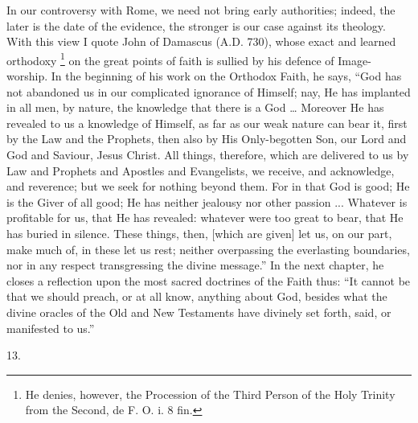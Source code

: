In our controversy with Rome, we need not bring early authorities;
indeed, the later is the date of the evidence, the stronger is our
case against its theology. With this view I quote John of Damascus (A.D.
730), whose exact and learned orthodoxy \footnote{He denies, however, the Procession of the Third Person of the
Holy Trinity from the Second, de F. O. i. 8 fin.} on the great points
of faith is sullied by his defence of Image-worship. In the beginning
of his work on the Orthodox Faith, he says, ``God has not
abandoned us in our complicated ignorance of Himself; nay, He has
implanted in all men, by nature, the knowledge that there is a God …
Moreover He has revealed to us a knowledge of Himself, as far as our
weak nature can bear it, first by the Law and the Prophets, then also
by His Only-begotten Son, our Lord and God and Saviour, Jesus Christ.
All things, therefore, which are delivered to us by Law and Prophets
and Apostles and Evangelists, we receive, and acknowledge, and
reverence; but we seek for nothing beyond them. For in that God
is good; He is the Giver of all good; He has neither jealousy nor
other passion ... Whatever is profitable for us, that He has revealed:
whatever were too great to bear, that He has buried in silence. These
things, then, [which are given] let us, on our part, make much of, in
these let us rest; neither overpassing the everlasting boundaries, nor
in any respect transgressing the divine message.'' In the next
chapter, he closes a reflection upon the most sacred doctrines of the
Faith thus: ``It cannot be that we should preach, or at all know,
anything about God, besides what the divine oracles of the Old and New
Testaments have divinely set forth, said, or manifested to us.''

13.

